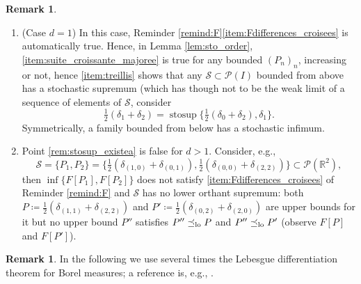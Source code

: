 \documentclass[JEP,XML,SOM,Unicode,NoEqCountersInSection,NoFloatCountersInSection,published]{cedram}
\theoremstyle{plain}
\theoremstyle{definition}
\newtheorem{rem}[them]{Remark}
\newcommand{\eqdef}{\coloneqq}
\newcommand{\p}{\mathcal{P}}
\newcommand{\R}{\mathbb{R}}
\newcommand{\stosup}{\operatorname{stosup}}
\newcommand{\leqlc}{\preceq_{\rm lo}}
\begin{document}
\skpt
\begin{rem}\label{rem:stosup_existe}
\begin{enumerate}
\item\label{rem:stosup_existea}
(Case $d=1$) In this case, Reminder \ref{remind:F}\eqref{item:Fdifferences_croisees} is automatically true. Hence, in Lemma \ref{lem:sto_order}, \eqref{item:suite_croissante_majoree} is true for any bounded $(P_n)_n$, increasing or not, hence \eqref{item:treillis} shows that any $\mathcal{S}\subset\p(I)$ bounded from above has a stochastic supremum (which has though not to be the weak limit of a sequence of elements of $\mathcal{S}$, consider
\[
\tfrac12(\delta_{1}+\delta_{2})=\stosup\bigl\{\tfrac12(\delta_{0}+\delta_{2}),\delta_{1}\bigr\}.
\]
Symmetrically, a family bounded from below has a stochastic infimum.

\item\label{rem:stosup_existeb}
Point \eqref{rem:stosup_existea} is false for $d>1$. Consider, e.g.,
\[
\mathcal{S}=\{P_1,P_2\}=\bigl\{\tfrac12(\delta_{(1,0)}+\delta_{(0,1)}),\tfrac12(\delta_{(0,0)}+\delta_{(2,2)})\bigr\}\subset\p(\R^2),
\]
then $\inf\{F[P_1],F[P_2]\}$ does not satisfy \eqref{item:Fdifferences_croisees} of Reminder \ref{remind:F} and $\mathcal{S}$ has no lower orthant supremum: both $P\eqdef\frac12(\delta_{(1,1)}+\delta_{(2,2)})$ and $P'\eqdef\frac12(\delta_{(0,2)}+\delta_{(2,0)})$ are upper bounds for it but no upper bound $P''$ satisfies $P''\leqlc P$ and $P''\leqlc P'$ (observe $F[P]$ and $F[P']$).
\end{enumerate}
\end{rem}

\begin{rem}In the following we use several times the Lebesgue differentiation theorem for Borel measures; a reference is, e.g., \cite[\S2.8--2.9]{Fe}.
\end{rem}
\end{document}
